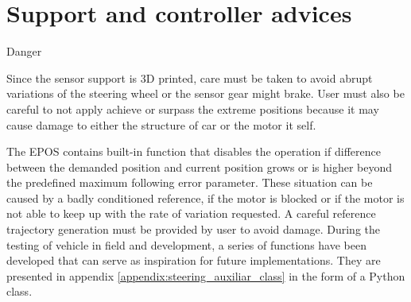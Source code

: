 \section{Support and controller advices}
\begin{mdframed}[backgroundcolor=red!20, roundcorner=10pt]
	 Danger
\end{mdframed}
Since the sensor support is 3D printed, care must be taken to avoid abrupt variations of the steering wheel or the sensor gear might brake. User must also be careful to not apply achieve or surpass the extreme positions because it may cause damage to either the structure of car or the motor it self.

The \gls{EPOS} contains built-in function that disables the operation if difference between the demanded position and current position grows or is higher beyond the predefined maximum following error parameter. These situation can be caused by a badly conditioned reference, if the motor is blocked or if the motor is not able to keep up with the rate of variation requested. A careful reference trajectory generation must be provided by user to avoid damage. During the testing of vehicle in field and development, a series of functions have been developed that can serve as inspiration for future implementations. They are presented in appendix \ref{appendix:steering_auxiliar_class} in the form of a Python class.

 